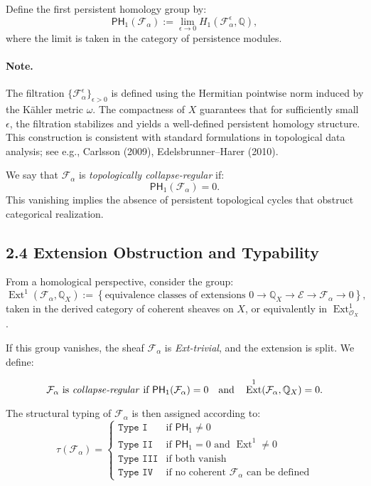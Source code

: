 \documentclass[11pt]{article}
\DeclareMathOperator{\Ext}{Ext}
\begin{document}
Define the first persistent homology group by:
\[
\mathsf{PH}_1(\mathcal{F}_\alpha) := \lim_{\epsilon \to 0} H_1(\mathcal{F}_\alpha^\epsilon, \mathbb{Q}),
\]
where the limit is taken in the category of persistence modules.

\paragraph{Note.}
The filtration $\{ \mathcal{F}_\alpha^\epsilon \}_{\epsilon > 0}$ is defined using the Hermitian pointwise norm induced by the Kähler metric $\omega$. The compactness of $X$ guarantees that for sufficiently small $\epsilon$, the filtration stabilizes and yields a well-defined persistent homology structure. This construction is consistent with standard formulations in topological data analysis; see e.g., Carlsson (2009), Edelsbrunner–Harer (2010).

We say that $\mathcal{F}_\alpha$ is \emph{topologically collapse-regular} if:
\[
\mathsf{PH}_1(\mathcal{F}_\alpha) = 0.
\]
This vanishing implies the absence of persistent topological cycles that obstruct categorical realization.

\subsection{2.4 Extension Obstruction and Typability}

From a homological perspective, consider the group:
\[
\Ext^1(\mathcal{F}_\alpha, \mathbb{Q}_X) := \left\{ \text{equivalence classes of extensions } 0 \to \mathbb{Q}_X \to \mathcal{E} \to \mathcal{F}_\alpha \to 0 \right\},
\]
taken in the derived category of coherent sheaves on $X$, or equivalently in $\operatorname{Ext}^1_{\mathcal{O}_X}$.

If this group vanishes, the sheaf $\mathcal{F}_\alpha$ is \emph{Ext-trivial}, and the extension is split. We define:

\[
\text{$\mathcal{F}_\alpha$ is \emph{collapse-regular} if } \mathsf{PH}_1(\mathcal{F}_\alpha) = 0 \quad \text{and} \quad \Ext^1(\mathcal{F}_\alpha, \mathbb{Q}_X) = 0.
\]

The structural typing of $\mathcal{F}_\alpha$ is then assigned according to:
\[
\tau(\mathcal{F}_\alpha) =
\begin{cases}
\texttt{Type I} & \text{if } \mathsf{PH}_1 \ne 0 \\
\texttt{Type II} & \text{if } \mathsf{PH}_1 = 0 \text{ and } \Ext^1 \ne 0 \\
\texttt{Type III} & \text{if both vanish} \\
\texttt{Type IV} & \text{if no coherent $\mathcal{F}_\alpha$ can be defined}
\end{cases}
\]
\end{document}
